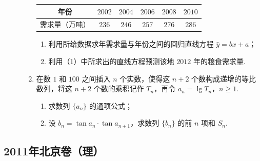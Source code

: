 \begin{description}
\begin{enumerate}[leftmargin=5pt]
\begin{center}
\begin{tabular}{c|ccccc}
年份 & \(2002\) & \(2004\) & \(2006\) & \(2008\) & \(2010\) \\
\hline
需求量（\(\text{万吨}\)） & \(236\) & \(246\) & \(257\) & \(276\) & \(286\)
\end{tabular}
\end{center}

\begin{enumerate}
\item 利用所给数据求年需求量与年份之间的回归直线方程 \(\hat{y} = bx + a\)；
\item 利用（1）中所求出的直线方程预测该地 \(2012\) 年的粮食需求量.
\end{enumerate}

        \item 在数 \(1\) 和 \(100\) 之间插入 \(n\) 个实数，使得这 \(n + 2\) 个数构成递增的等比数列，将这 \(n + 2\) 个数的乘积记作 \(T_{n}\)，再令 \(a_{n} = \lg T_{n}\)，\(n \geqslant 1\).
\begin{enumerate}
\item 求数列 \(\{a_{n}\}\) 的通项公式；
\item 设 \(b_{n} = \tan a_{n} \cdot \tan a_{n+1}\)，求数列 \(\{b_{n}\}\) 的前 \(n\) 项和 \(S_{n}\).
\end{enumerate}

    \end{enumerate}

\end{description}


\subsection{2011年北京卷（理）}\label{gk:2011年北京卷（理）}

